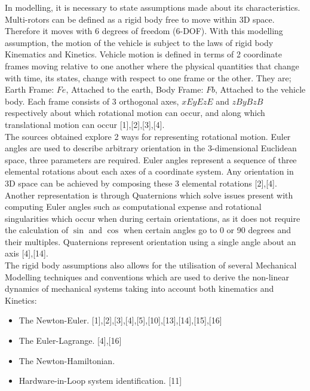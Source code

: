 \documentclass[12pt,a4paper,twoside]{report}
\begin{document}
				In modelling, it is necessary to state assumptions made about its characteristics. Multi-rotors can be  defined as a rigid body free to move within 3D space. Therefore it moves with 6 degrees of freedom (6-DOF). With this modelling assumption,  the motion of the vehicle is subject to the laws of rigid body Kinematics and Kinetics. Vehicle motion is defined in terms of 2 coordinate frames moving relative to one another where the physical quantities that change with time, its states, change with respect to one frame or the other. They are; Earth Frame: \(Fe\), Attached to the earth, Body Frame: \(Fb\), Attached to the vehicle body. Each frame consists of 3 orthogonal axes, \(xE yE zE\) and \(zB yB zB\) respectively about which rotational motion can occur, and along which translational motion can occur [1],[2],[3],[4].
				\\
				The sources obtained explore 2 ways for representing rotational motion. Euler angles are used to describe arbitrary orientation in the 3-dimensional Euclidean space, three parameters are required. Euler angles represent a sequence of three elemental rotations about each axes of a coordinate system. Any orientation in 3D space can be achieved by composing these 3 elemental rotations [2],[4]. Another representation is through Quaternions which solve issues present with computing Euler angles such as computational expense and rotational singularities which occur when during certain orientations, as it does not require the calculation of $\sin$ and $\cos$ when certain angles go to 0 or 90 degrees and their multiples. Quaternions represent orientation using a single angle about an axis [4],[14].
				\\ 
				The rigid body assumptions also allows for the utilisation of several Mechanical Modelling techniques and conventions which are used to derive the non-linear dynamics of mechanical systems taking into account both kinematics and Kinetics:
				
				\begin{itemize}
					\item 
						The Newton-Euler. [1],[2],[3],[4],[5],[10],[13],[14],[15],[16]
					\item
						The Euler-Lagrange. [4],[16]
					\item
						The Newton-Hamiltonian.
					\item 
						Hardware-in-Loop system identification. [11]
				\end{itemize}
				
\end{document}
